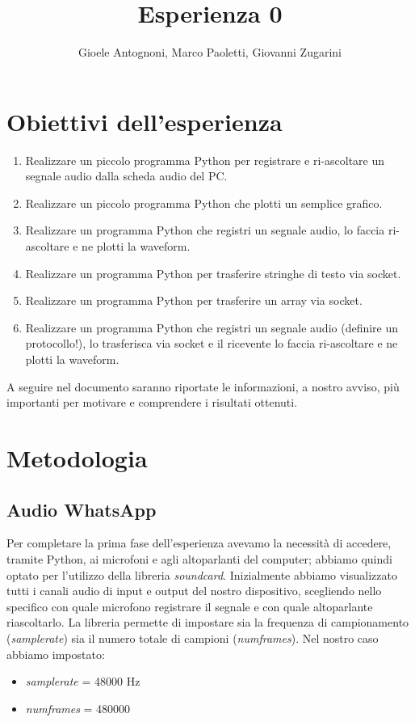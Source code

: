 \documentclass[12pt,a4paper]{article}
\title{Esperienza 0}
\author{Gioele Antognoni, Marco Paoletti, Giovanni Zugarini}
\date{}
\begin{document}
\maketitle

\section*{Obiettivi dell'esperienza}

\begin{enumerate}
    \item Realizzare un piccolo programma Python per registrare e ri-ascoltare un segnale audio dalla scheda audio del PC.
    \item Realizzare un piccolo programma Python che plotti un semplice grafico.
    \item Realizzare un programma Python che registri un segnale audio, lo faccia ri-ascoltare e ne plotti la waveform.
    \item Realizzare un programma Python per trasferire stringhe di testo via socket.
    \item Realizzare un programma Python per trasferire un array via socket.
    \item Realizzare un programma Python che registri un segnale audio (definire un protocollo!), lo trasferisca via socket e il ricevente lo faccia ri-ascoltare e ne plotti la waveform.
\end{enumerate}

A seguire nel documento saranno riportate le informazioni, a nostro avviso, più importanti per motivare e comprendere i risultati ottenuti.

\section{Metodologia}

\subsection{Audio WhatsApp}

Per completare la prima fase dell'esperienza avevamo la necessità di accedere, tramite Python, ai microfoni e agli altoparlanti del computer; abbiamo quindi optato per l'utilizzo della libreria \textit{soundcard}. Inizialmente abbiamo visualizzato tutti i canali audio di input e output del nostro dispositivo, scegliendo nello specifico con quale microfono registrare il segnale e con quale altoparlante riascoltarlo. La libreria permette di impostare sia la frequenza di campionamento (\textit{samplerate}) sia il numero totale di campioni (\textit{numframes}). Nel nostro caso abbiamo impostato:
\begin{itemize}
    \item \textit{samplerate} = 48000 Hz
    \item \textit{numframes} = 480000
\end{itemize}
\end{document}
